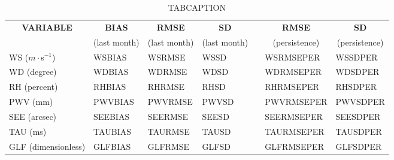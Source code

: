 \begin{table}[]
\begin{center}
\begin{tabular}{|l|l|l|l|l|l|l|}
\hline
\multicolumn{1}{|c|}{\cellcolor[HTML]{C0C0C0}\textbf{VARIABLE}} & \multicolumn{1}{c|}{\cellcolor[HTML]{C0C0C0}\textbf{BIAS}} & \multicolumn{1}{c|}{\cellcolor[HTML]{C0C0C0}\textbf{RMSE}} & \multicolumn{1}{c|}{\cellcolor[HTML]{C0C0C0}\textbf{SD}} & & \multicolumn{1}{c|}{\cellcolor[HTML]{C0C0C0}\textbf{RMSE}} & \multicolumn{1}{c|}{\cellcolor[HTML]{C0C0C0}\textbf{SD}}\\
\multicolumn{1}{|c|}{\cellcolor[HTML]{C0C0C0}} & \multicolumn{1}{c|}{\cellcolor[HTML]{C0C0C0}(last month)} & \multicolumn{1}{c|}{\cellcolor[HTML]{C0C0C0}(last month)} & \multicolumn{1}{c|}{\cellcolor[HTML]{C0C0C0}(last month)} & & \multicolumn{1}{c|}{\cellcolor[HTML]{C0C0C0}(persistence)} & \multicolumn{1}{c|}{\cellcolor[HTML]{C0C0C0}(persistence)}\\\hline
\cellcolor[HTML]{C0C0C0}WS ($m\cdot$s$^{-1}$) & WSBIAS  & WSRMSE  & WSSD  & & WSRMSEPER  & WSSDPER\\
\cellcolor[HTML]{C0C0C0}WD (degree)           & WDBIAS  & WDRMSE  & WDSD  & & WDRMSEPER  & WDSDPER\\
\cellcolor[HTML]{C0C0C0}RH (percent)          & RHBIAS  & RHRMSE  & RHSD  & & RHRMSEPER  & RHSDPER\\
\cellcolor[HTML]{C0C0C0}PWV (mm)              & PWVBIAS & PWVRMSE & PWVSD & & PWVRMSEPER & PWVSDPER\\
\cellcolor[HTML]{C0C0C0}SEE (arcsec)          & SEEBIAS & SEERMSE & SEESD & & SEERMSEPER & SEESDPER\\
\cellcolor[HTML]{C0C0C0}TAU (ms)              & TAUBIAS & TAURMSE & TAUSD & & TAURMSEPER & TAUSDPER\\
\cellcolor[HTML]{C0C0C0}GLF (dimensionless)   & GLFBIAS & GLFRMSE & GLFSD & & GLFRMSEPER & GLFSDPER\\
\hline
\end{tabular}
\caption{TABCAPTION}
\end{center}
\end{table}

